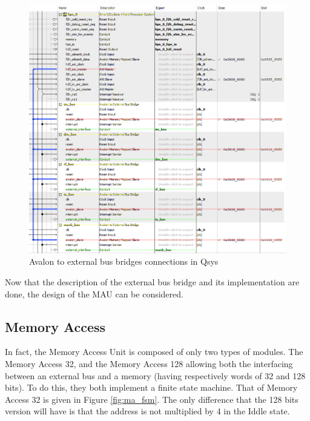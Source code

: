 \begin{figure}[H]
    \center
    \includegraphics[width=\linewidth]{"Chapter6-MAU_CTRLU/res/qsys_mau.PNG"}
    \caption{Avalon to external bus bridges connections in Qsys}
    \label{fig:avalon/bus}
\end{figure}

Now that the description of the external bus bridge and its implementation are done, the design of 
the MAU can be considered.

\subsection{Memory Access}

In fact, the Memory Access Unit is composed of only two types of modules. The Memory Access 32, and 
the Memory Access 128 allowing both the interfacing between an external bus and a memory (having 
respectively words of 32 and 128 bits). To do this, they both implement a finite state machine. 
That of Memory Access 32 is given in Figure \ref{fig:ma_fsm}. The only difference that the 128 bits version will 
have is that the address is not multiplied by 4 in the Iddle state. 

